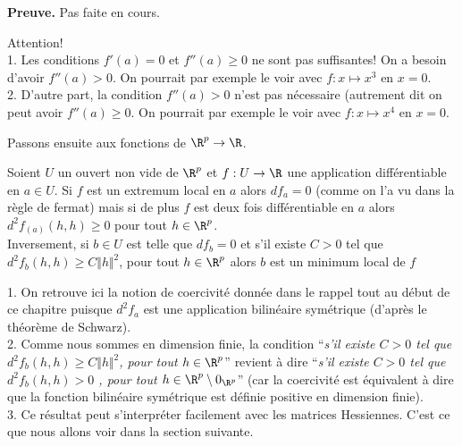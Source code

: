 \documentclass[class=report,crop=false]{standalone}
\begin{document}
{\textbf{Preuve.}}  Pas faite en cours.




\begin{remarque*}
\textcolor[rgb]{0.00,0.00,1.00}{
  Attention! \\
1. Les conditions $f'(a)=0$ et $f''(a) \geq 0$ ne sont pas suffisantes! On a besoin d'avoir $f''(a)>0$. On pourrait par exemple le voir avec $f: x \mapsto x^3$ en $x=0$.\\
2. D'autre part, la condition $f''(a) >0$ n'est pas nécessaire (autrement dit on peut avoir $f''(a) \geq 0$. On pourrait par exemple le voir avec  $f: x \mapsto x^4$ en $x=0$.}
\end{remarque*}


\noindent Passons ensuite aux fonctions de $\R^p \rightarrow \R$.


\begin{proposition}
\textcolor[rgb]{0.44,0.00,0.87}{
 Soient $U$ un ouvert non vide de $\R^p$ et $f: U  \rightarrow \R$ une application différentiable en $a \in U$. Si $f$ est un extremum local en $a$ alors  $df_a=0$ (comme on l'a vu dans la règle de fermat) mais si de plus $f$ est deux fois différentiable en $a$ alors
 $d^2f_(a)(h,h) \geq 0$ pour tout $h \in \R^p$.\\
 Inversement, si $b \in U$ est telle que $df_b=0$ et s'il existe $C>0$ tel que $d^2f_b (h,h) \geq C \Vert h \Vert^2$, pour tout $h \in \R^p$ alors $b$ est un minimum local de $f$}
\end{proposition}

\begin{remarque*} $ $\\
\textcolor[rgb]{0.00,0.00,1.00}{
1. On retrouve ici la notion de coercivité donnée dans le rappel tout au début de ce chapitre puisque $d^2f_a$ est une application bilinéaire symétrique (d'après le théorème de Schwarz).\\ 
2. Comme nous sommes en dimension finie, la condition ``\textit{s'il existe $C>0$ tel que $d^2f_b (h,h) \geq C \Vert h \Vert^2$, pour tout $h \in \R^p$}'' revient à dire ``\textit{s'il existe $C>0$ tel que $d^2f_b (h,h) >0$ , pour tout $h \in \R^p \setminus 0_{\R^p}$}'' (car la coercivité est équivalent à dire que la fonction bilinéaire symétrique est définie positive en dimension finie).\\
3. Ce résultat peut s'interpréter facilement avec les matrices Hessiennes. C'est ce que nous allons voir dans la section suivante.
}
\end{remarque*}
\end{document}
